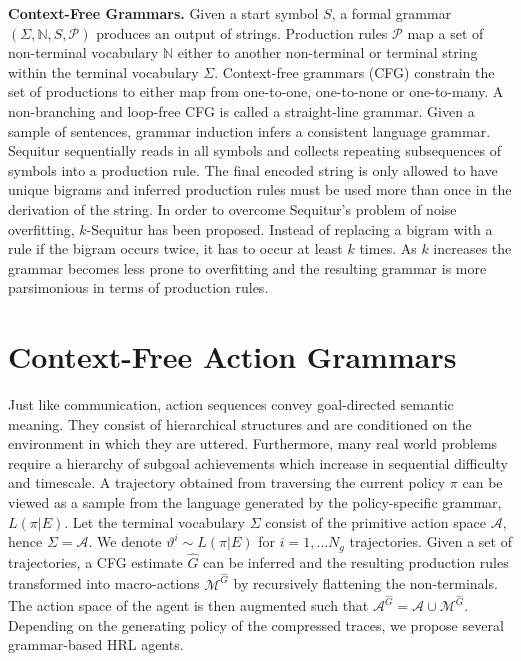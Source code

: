 \documentclass[10pt,letterpaper]{article}
\begin{document}
\textbf{Context-Free Grammars.} Given a start symbol $S$, a formal grammar $(\Sigma, \mathbb{N}, S, \mathcal{P})$ produces an output of strings. Production rules $\mathcal{P}$ map a set of non-terminal vocabulary $\mathbb{N}$ either to another non-terminal or terminal string within the terminal vocabulary $\Sigma$.
Context-free grammars (CFG) \cite{Chomsky_1959a} constrain the set of productions to either map from one-to-one, one-to-none or one-to-many. A non-branching and loop-free CFG is called a straight-line grammar. Given a sample of sentences, grammar induction infers a consistent language grammar.
Sequitur \cite{Manning_1997} sequentially reads in all symbols and collects repeating subsequences of symbols into a production rule. The final encoded string is only allowed to have unique bigrams and inferred production rules must be used more than once in the derivation of the string.
In order to overcome Sequitur's problem of noise overfitting, $k$-Sequitur \cite{Stout_2018} has been proposed. Instead of replacing a bigram with a rule if the bigram occurs twice, it has to occur at least $k$ times. As $k$ increases the grammar becomes less prone to overfitting and the resulting grammar is more parsimonious in terms of production rules. 

\section{Context-Free Action Grammars}

Just like communication, action sequences convey goal-directed semantic meaning. They consist of hierarchical structures and are conditioned on the environment in which they are uttered. 
Furthermore, many real world problems require a hierarchy of subgoal achievements which increase in sequential difficulty and timescale.
A trajectory obtained from traversing the current policy $\pi$ can be viewed as a sample from the language generated by the policy-specific grammar, $L(\pi|E)$. Let the terminal vocabulary $\Sigma$ consist of the primitive action space $\mathcal{A}$, hence $\Sigma = \mathcal{A}$. We denote  $\vartheta^i \sim L(\pi|E)$ for $i = 1, \dots N_g$ trajectories. Given a set of trajectories, a CFG estimate $\hat{G}$ can be inferred and the resulting production rules transformed into macro-actions $\mathcal{M}^{\hat{G}}$ by recursively flattening the non-terminals. The action space of the agent is then augmented such that $\mathcal{A}^{\hat{G}} = \mathcal{A} \cup \mathcal{M}^{\hat{G}}$. Depending on the generating policy of the compressed traces, we propose several grammar-based HRL agents.
\end{document}
